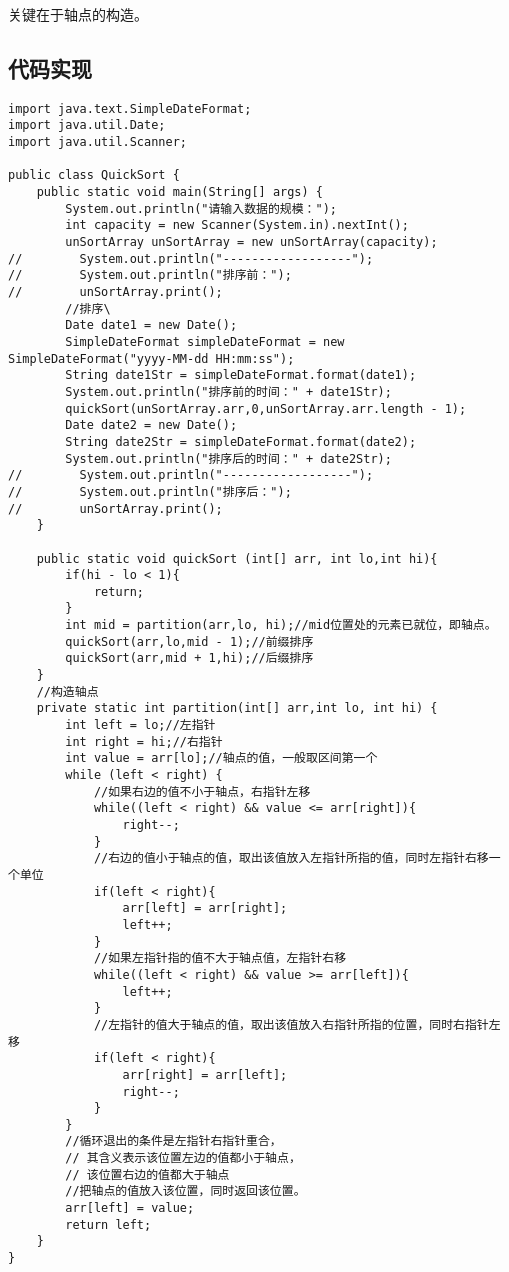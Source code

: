 \documentclass[a4paper]{report}
\begin{document}
关键在于轴点的构造。
\subsection{代码实现}
\begin{lstlisting}
import java.text.SimpleDateFormat;
import java.util.Date;
import java.util.Scanner;

public class QuickSort {
    public static void main(String[] args) {
        System.out.println("请输入数据的规模：");
        int capacity = new Scanner(System.in).nextInt();
        unSortArray unSortArray = new unSortArray(capacity);
//        System.out.println("------------------");
//        System.out.println("排序前：");
//        unSortArray.print();
        //排序\
        Date date1 = new Date();
        SimpleDateFormat simpleDateFormat = new SimpleDateFormat("yyyy-MM-dd HH:mm:ss");
        String date1Str = simpleDateFormat.format(date1);
        System.out.println("排序前的时间：" + date1Str);
        quickSort(unSortArray.arr,0,unSortArray.arr.length - 1);
        Date date2 = new Date();
        String date2Str = simpleDateFormat.format(date2);
        System.out.println("排序后的时间：" + date2Str);
//        System.out.println("------------------");
//        System.out.println("排序后：");
//        unSortArray.print();
    }

    public static void quickSort (int[] arr, int lo,int hi){
        if(hi - lo < 1){
            return;
        }
        int mid = partition(arr,lo, hi);//mid位置处的元素已就位，即轴点。
        quickSort(arr,lo,mid - 1);//前缀排序
        quickSort(arr,mid + 1,hi);//后缀排序
    }
    //构造轴点
    private static int partition(int[] arr,int lo, int hi) {
        int left = lo;//左指针
        int right = hi;//右指针
        int value = arr[lo];//轴点的值，一般取区间第一个
        while (left < right) {
            //如果右边的值不小于轴点，右指针左移
            while((left < right) && value <= arr[right]){
                right--;
            }
            //右边的值小于轴点的值，取出该值放入左指针所指的值，同时左指针右移一个单位
            if(left < right){
                arr[left] = arr[right];
                left++;
            }
            //如果左指针指的值不大于轴点值，左指针右移
            while((left < right) && value >= arr[left]){
                left++;
            }
            //左指针的值大于轴点的值，取出该值放入右指针所指的位置，同时右指针左移
            if(left < right){
                arr[right] = arr[left];
                right--;
            }
        }
        //循环退出的条件是左指针右指针重合，
        // 其含义表示该位置左边的值都小于轴点，
        // 该位置右边的值都大于轴点
        //把轴点的值放入该位置，同时返回该位置。
        arr[left] = value;
        return left;
    }
}
\end{lstlisting}
\end{document}

